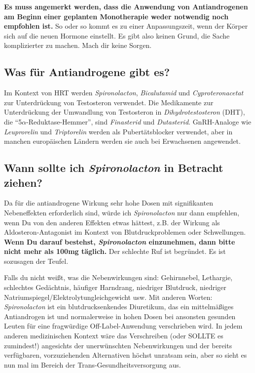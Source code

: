 \documentclass{article}
\begin{document}
{{{\textbf{Es muss angemerkt werden, dass die Anwendung von Antiandrogenen am Beginn einer geplanten Monotherapie weder notwendig noch empfohlen ist.} So oder so kommt es zu einer Anpassungszeit, wenn der Körper sich auf die neuen Hormone einstellt. Es gibt also keinen Grund, die Sache komplizierter zu machen. Mach dir keine Sorgen.

\subsection{Was für Antiandrogene gibt es?}

Im Kontext von HRT werden \textit{Spironolacton}, \textit{Bicalutamid} und \textit{Cyproteronacetat} zur Unterdrückung von Testosteron verwendet. Die Medikamente zur Unterdrückung der Umwandlung von Testosteron in \textit{Dihydrotestosteron} (DHT), die “5$\alpha$-Reduktase-Hemmer”,  sind \textit{Finasterid} und \textit{Dutasterid}. GnRH-Analoge wie \textit{Leuprorelin} und \textit{Triptorelin} werden als Pubertätsblocker verwendet, aber in manchen europäischen Ländern werden sie auch bei Erwachsenen angewendet.

\subsection{Wann sollte ich \textit{Spironolacton} in Betracht ziehen?}

Da für die antiandrogene Wirkung sehr hohe Dosen mit signifikanten Nebeneffekten erforderlich sind, würde ich \textit{Spironolacton} nur dann empfehlen, wenn Du von den anderen Effekten etwas hättest, z.B. der Wirkung als  Aldosteron-Antagonist im Kontext von Blutdruckproblemen oder Schwellungen. \textbf{Wenn Du darauf bestehst, \textit{Spironolacton} einzunehmen, dann bitte nicht mehr als 100mg täglich.} Der schlechte Ruf ist begründet. Es ist sozusagen der Teufel.

Falls du nicht weißt, was die Nebenwirkungen sind: Gehirnnebel, Lethargie, schlechtes Gedächtnis, häufiger Harndrang, niedriger Blutdruck, niedriger Natriumspiegel/Elektrolytungleichgewicht usw. Mit anderen Worten: \textit{Spironolacton} ist ein blutdrucksenkendes Diuretikum, das ein mittelmäßiges Antiandrogen ist und normalerweise in hohen Dosen bei ansonsten gesunden Leuten für eine fragwürdige Off-Label-Anwendung verschrieben wird. In jedem anderen medizinischen Kontext wäre das Verschreiben (oder SOLLTE es zumindest!) angesichts der unerwünschten Nebenwirkungen und der bereits verfügbaren, vorzuziehenden Alternativen höchst unratsam sein, aber so sieht es nun mal im Bereich der Trans-Gesundheitsversorgung aus.

}}}
\end{document}
